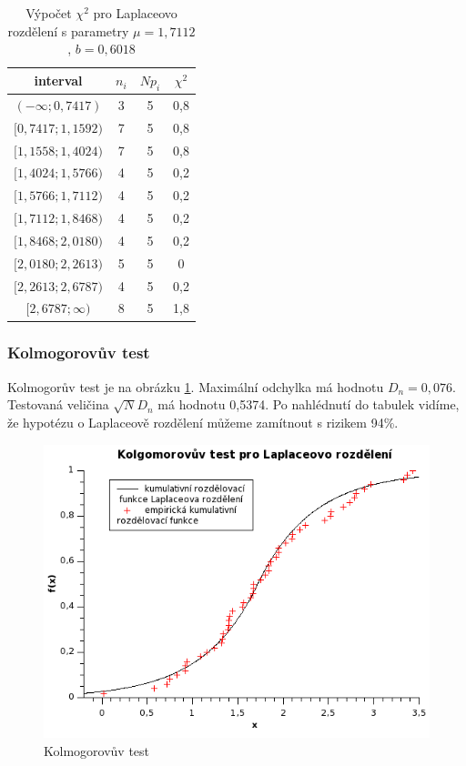 \documentclass[12pt]{article}
\begin{document}
\begin{table}[h!]
 \centering
 \begin{tabular}{|c|c|c|c|}
  \hline
  {\bf interval} & {\bf $n_i$} & {\bf $Np_i$}  & {\bf $\chi^2$}\\
   \hline \hline
	$(-\infty; 0,7417)$ & 3 & 5 & 0,8 \\
	$[0,7417; 1,1592)$ & 7 & 5 & 0,8 \\
	$[1,1558; 1,4024)$ & 7 & 5 & 0,8 \\
	$[1,4024; 1,5766)$ & 4 & 5 & 0,2 \\
	$[1,5766; 1,7112)$ & 4 & 5 & 0,2 \\
	$[1,7112; 1,8468)$ & 4 & 5 & 0,2 \\
	$[1,8468; 2,0180)$ & 4 & 5 & 0,2 \\
	$[2,0180; 2,2613)$ & 5 & 5 & 0 \\
	$[2,2613; 2,6787)$ & 4 & 5 & 0,2 \\
	$[2,6787; \infty)$ & 8 & 5 & 1,8 \\
	\hline
  \end{tabular}
  \caption{Výpočet $\chi^2$ pro Laplaceovo rozdělení s parametry  $\mu = 1,7112$, $b = 0,6018$}
  \label{intervaly2}
\end{table}

\subsubsection{Kolmogorovův test}
Kolmogorův test je na obrázku \ref{fig:kol3}. Maximální odchylka má hodnotu $D_n = 0,076$. Testovaná veličina $\sqrt{N}D_n$ má hodnotu 0,5374. Po nahlédnutí do tabulek vidíme, že hypotézu o Laplaceově rozdělení můžeme zamítnout s rizikem 94\%.

\begin{figure}[h!]
  \centering
  \includegraphics[width=13cm]{Graph7.png}
  \caption{Kolmogorovův test}
  \label{fig:kol3} 
\end{figure}
\end{document}
